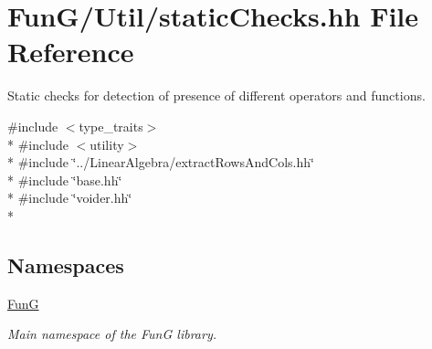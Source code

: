 \hypertarget{staticChecks_8hh}{\section{Fun\-G/\-Util/static\-Checks.hh File Reference}
\label{staticChecks_8hh}
}


Static checks for detection of presence of different operators and functions.  


{\ttfamily \#include $<$type\-\_\-traits$>$}\\*
{\ttfamily \#include $<$utility$>$}\\*
{\ttfamily \#include \char`\"{}../\-Linear\-Algebra/extract\-Rows\-And\-Cols.\-hh\char`\"{}}\\*
{\ttfamily \#include \char`\"{}base.\-hh\char`\"{}}\\*
{\ttfamily \#include \char`\"{}voider.\-hh\char`\"{}}\\*
\subsection*{Namespaces}
\begin{DoxyCompactItemize}
\item 
\hyperlink{namespaceFunG}{Fun\-G}
\begin{DoxyCompactList}\small\item\em Main namespace of the Fun\-G library. \end{DoxyCompactList}\end{DoxyCompactItemize}
